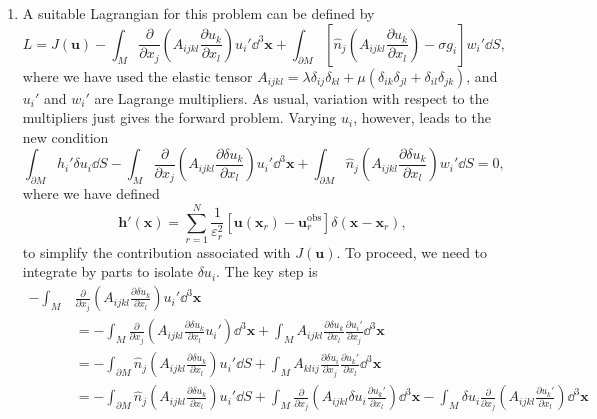 \documentclass[a4paper,10pt]{paper}
\begin{document}
\begin{enumerate}
\item A suitable Lagrangian for this problem can be defined by
\begin{equation*}
    L=J(\mathbf{u})-\int_{M}\frac{\partial}{\partial x_{j}}\left(A_{ijkl}\frac{\partial u_{k}}{\partial x_{l}}\right)u_{i}'\dd^{3}\mathbf{x}+\int_{\partial M}\left[\hat{n}_{j}\left(A_{ijkl}\frac{\partial u_{k}}{\partial x_{l}}\right)-\sigma g_{i}\right]w_{i}'\dd S,
\end{equation*}
where we have used the elastic tensor $A_{ijkl}=\lambda\delta_{ij}\delta_{kl}+\mu(\delta_{ik}\delta_{jl}+\delta_{il}\delta_{jk})$, and $u_{i}'$ and $w_{i}'$ are Lagrange multipliers. As usual, variation with respect to the multipliers just gives the forward problem. Varying $u_{i}$, however, leads to the new condition
\begin{equation*}
    \int_{\partial M}h_{i}'\delta u_{i}\dd S-\int_{M}\frac{\partial}{\partial x_{j}}\left(A_{ijkl}\frac{\partial\delta u_{k}}{\partial x_{l}}\right)u_{i}'\dd^{3}\mathbf{x}+\int_{\partial M}\hat{n}_{j}\left(A_{ijkl}\frac{\partial\delta u_{k}}{\partial x_{l}}\right)w_{i}'\dd S=0,
\end{equation*}
where we have defined
\begin{equation*}
    \mathbf{h}'(\mathbf{x})=\sum_{r=1}^{N}\frac{1}{\varepsilon_{r}^{2}}[\mathbf{u}(\mathbf{x}_{r})-\mathbf{u}_{r}^{\mathrm{obs}}]\delta(\mathbf{x}-\mathbf{x}_{r}),
\end{equation*}
to simplify the contribution associated with $J(\mathbf{u})$. To proceed, we need to integrate by parts to isolate $\delta u_{i}$. The key step is
\begin{align*}
    -\int_{M}&\frac{\partial}{\partial x_{j}}\left(A_{ijkl}\frac{\partial\delta u_{k}}{\partial x_{l}}\right)u_{i}'\dd^{3}\mathbf{x} \\
    &=-\int_{M}\frac{\partial}{\partial x_{j}}\left(A_{ijkl}\frac{\partial\delta u_{k}}{\partial x_{l}}u_{i}'\right)\dd^{3}\mathbf{x}+\int_{M}A_{ijkl}\frac{\partial\delta u_{k}}{\partial x_{l}}\frac{\partial u_{i}'}{\partial x_{j}}\dd^{3}\mathbf{x} \\
    &=-\int_{\partial M}\hat{n}_{j}\left(A_{ijkl}\frac{\partial\delta u_{k}}{\partial x_{l}}\right)u_{i}'\dd S+\int_{M}A_{klij}\frac{\partial\delta u_{i}}{\partial x_{j}}\frac{\partial u_{k}'}{\partial x_{l}}\dd^{3}\mathbf{x} \\
    &=-\int_{\partial M}\hat{n}_{j}\left(A_{ijkl}\frac{\partial\delta u_{k}}{\partial x_{l}}\right)u_{i}'\dd S+\int_{M}\frac{\partial}{\partial x_{j}}\left(A_{ijkl}\delta u_{i}\frac{\partial u_{k}'}{\partial x_{l}}\right)\dd^{3}\mathbf{x} -\int_{M}\delta u_{i}\frac{\partial}{\partial x_{j}}\left(A_{ijkl}\frac{\partial u_{k}'}{\partial x_{l}}\right)\dd^{3}\mathbf{x} \\

\end{align*}
\end{enumerate}
\end{document}
